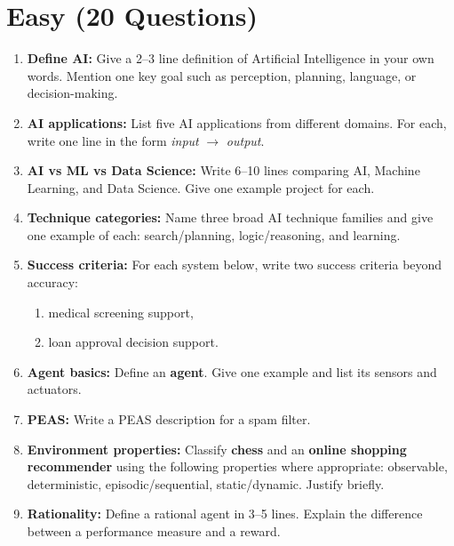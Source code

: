 \documentclass[11pt,a4paper]{article}
\begin{document}
\section*{Easy (20 Questions)}
\begin{enumerate}[label=E\arabic*., leftmargin=*]
  \item \textbf{Define AI:} Give a 2--3 line definition of Artificial Intelligence in your own words.
    Mention one key goal such as perception, planning, language, or decision-making.

  \item \textbf{AI applications:} List five AI applications from different domains.
    For each, write one line in the form \emph{input} $\rightarrow$ \emph{output}.

  \item \textbf{AI vs ML vs Data Science:} Write 6--10 lines comparing AI, Machine Learning, and Data Science.
    Give one example project for each.

  \item \textbf{Technique categories:} Name three broad AI technique families and give one example of each:
    search/planning, logic/reasoning, and learning.

  \item \textbf{Success criteria:} For each system below, write two success criteria beyond accuracy:
    \begin{enumerate}[label=(\alph*), leftmargin=*]
      \item medical screening support,
      \item loan approval decision support.
    \end{enumerate}

  \item \textbf{Agent basics:} Define an \textbf{agent}. Give one example and list its sensors and actuators.

  \item \textbf{PEAS:} Write a PEAS description for a spam filter.

  \item \textbf{Environment properties:} Classify \textbf{chess} and an \textbf{online shopping recommender}
    using the following properties where appropriate: observable, deterministic, episodic/sequential, static/dynamic.
    Justify briefly.

  \item \textbf{Rationality:} Define a rational agent in 3--5 lines.
    Explain the difference between a performance measure and a reward.


\end{enumerate}
\end{document}
